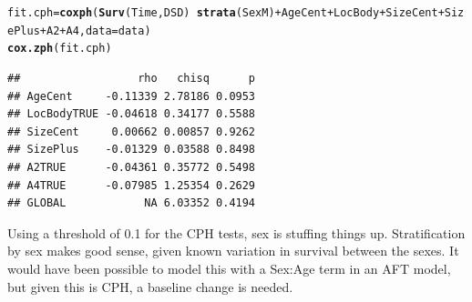 \documentclass{article}\usepackage[]{graphicx}\usepackage[]{color}
\makeatletter
\newcommand{\hlopt}[1]{\textcolor[rgb]{0,0,0}{#1}}%
\newcommand{\hlstd}[1]{\textcolor[rgb]{0.345,0.345,0.345}{#1}}%
\newcommand{\hlkwb}[1]{\textcolor[rgb]{0.69,0.353,0.396}{#1}}%
\newcommand{\hlkwc}[1]{\textcolor[rgb]{0.333,0.667,0.333}{#1}}%
\newcommand{\hlkwd}[1]{\textcolor[rgb]{0.737,0.353,0.396}{\textbf{#1}}}%
\newenvironment{kframe}{%
 \def\at@end@of@kframe{}%
 \ifinner\ifhmode%
  \def\at@end@of@kframe{\end{minipage}}%
  \begin{minipage}{\columnwidth}%
 \fi\fi%
 \def\FrameCommand##1{\hskip\@totalleftmargin \hskip-\fboxsep
 \colorbox{shadecolor}{##1}\hskip-\fboxsep
     \hskip-\linewidth \hskip-\@totalleftmargin \hskip\columnwidth}%
 \MakeFramed {\advance\hsize-\width
   \@totalleftmargin\z@ \linewidth\hsize
   \@setminipage}}%
 {\par\unskip\endMakeFramed%
 \at@end@of@kframe}
\newenvironment{knitrout}{}{} %
\makeatother
\begin{document}
\begin{knitrout}
{}


\begin{kframe}\begin{alltt}
\hlstd{fit.cph} \hlkwb{=} \hlkwd{coxph}\hlstd{(}\hlkwd{Surv}\hlstd{(Time, DSD)} \hlopt{~} \hlkwd{strata}\hlstd{(SexM)} \hlopt{+} \hlstd{AgeCent} \hlopt{+} \hlstd{LocBody} \hlopt{+} \hlstd{SizeCent} \hlopt{+} \hlstd{SizePlus} \hlopt{+} \hlstd{A2} \hlopt{+} \hlstd{A4,} \hlkwc{data} \hlstd{= data)}
\hlkwd{cox.zph}\hlstd{(fit.cph)}
\end{alltt}
\begin{verbatim}
##                  rho   chisq      p
## AgeCent     -0.11339 2.78186 0.0953
## LocBodyTRUE -0.04618 0.34177 0.5588
## SizeCent     0.00662 0.00857 0.9262
## SizePlus    -0.01329 0.03588 0.8498
## A2TRUE      -0.04361 0.35772 0.5498
## A4TRUE      -0.07985 1.25354 0.2629
## GLOBAL            NA 6.03352 0.4194
\end{verbatim}
\end{kframe}
\end{knitrout}
Using a threshold of 0.1 for the CPH tests, sex is stuffing things up.  Stratification by sex makes good sense, given known variation in survival between the sexes.  It would have been possible to model this with a Sex:Age term in an AFT model, but given this is CPH, a baseline change is needed.
\end{document}

